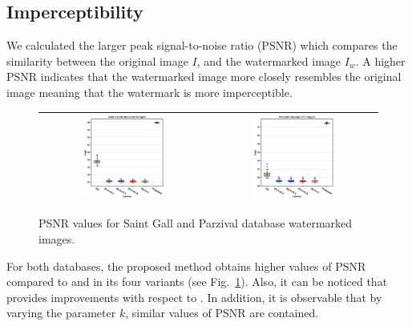 \documentclass[runningheads]{llncs}
\begin{document}
\subsection{Imperceptibility}
We calculated the larger peak signal-to-noise ratio (PSNR) which compares the similarity between the original image $ I $, and the watermarked image $ I_w $. A higher PSNR indicates that the watermarked image more closely resembles the original image meaning that the watermark is more imperceptible.
\begin{figure}[H]
	\begin{center}
		\begin{tabular}{|c|c|}\hline
			\includegraphics[width=0.5\textwidth]{PSNR_saintgall.eps}
			&\includegraphics[width=0.5\textwidth]{PSNR_parzival.eps}\\\hline
		\end{tabular}
	\end{center}
	\caption{PSNR values for Saint Gall and Parzival database watermarked images.}
	\label{psnr}
\end{figure}
For both databases, the proposed method obtains higher values of PSNR compared to \cite{shivani2017dual} and \cite{liu2018blind} in its four variants (see Fig.~\ref{psnr}). Also, it can be noticed that \cite{shivani2017dual} provides improvements with respect to \cite{liu2018blind}. In addition, it is observable that by varying the parameter $k$, similar values of PSNR are contained.  
\end{document}
